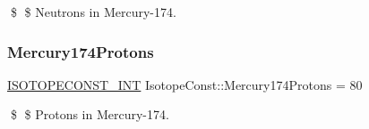 \$ \$ Neutrons in Mercury-\/174. \mbox{\label{group___isotope_const-_mercury-_hg174_ga434cc9146871417912b8e33a23752b20}} 
\subsubsection{\texorpdfstring{Mercury174\+Protons}{Mercury174Protons}}
{\footnotesize\ttfamily \mbox{\hyperlink{group___isotope_const-_macros_ga5f18360b3e99483a35c32d789e62621c}{I\+S\+O\+T\+O\+P\+E\+C\+O\+N\+S\+T\+\_\+\+I\+NT}} Isotope\+Const\+::\+Mercury174\+Protons = 80}

\$ \$ Protons in Mercury-\/174. 